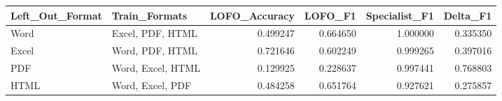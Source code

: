 \begin{tabular}{llrrrr}
\toprule
Left_Out_Format & Train_Formats & LOFO_Accuracy & LOFO_F1 & Specialist_F1 & Delta_F1 \\
\midrule
Word & Excel, PDF, HTML & 0.499247 & 0.664650 & 1.000000 & 0.335350 \\
Excel & Word, PDF, HTML & 0.721646 & 0.602249 & 0.999265 & 0.397016 \\
PDF & Word, Excel, HTML & 0.129925 & 0.228637 & 0.997441 & 0.768803 \\
HTML & Word, Excel, PDF & 0.484258 & 0.651764 & 0.927621 & 0.275857 \\
\bottomrule
\end{tabular}
